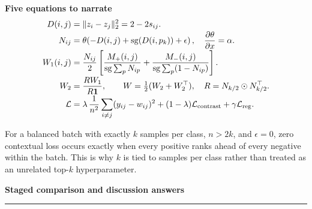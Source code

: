 \documentclass[10pt]{article}
\newcommand{\sg}{\operatorname{sg}}
\begin{document}
\textbf{Five equations to narrate}
\begin{align*}
D(i,j)&=\lVert z_i-z_j\rVert_2^2=2-2s_{ij}.\\[-2pt]
N_{ij}&=\theta\!\left(-D(i,j)+\sg(D(i,p_k))+\epsilon\right),
\quad \frac{\partial\theta}{\partial x}=\alpha.\\[-2pt]
W_1(i,j)&=\frac{N_{ij}}{2}\left[\frac{M_+(i,j)}{\sg\sum_pN_{ip}}+\frac{M_-(i,j)}{\sg\sum_p(1-N_{ip})}\right].\\[-2pt]
W_2&=\frac{RW_1}{R\mathbf 1},\qquad W=\tfrac12(W_2+W_2^\top),\quad R=N_{k/2}\odot N_{k/2}^\top.\\[-2pt]
\mathcal L&=\lambda\,\frac{1}{n^2}\sum_{i\ne j}(y_{ij}-w_{ij})^2+(1-\lambda)\mathcal L_{\rm contrast}+\gamma\mathcal L_{\rm reg}.
\end{align*}

\begin{meetbox}[title=\textbf{The key theoretical statement}]
For a balanced batch with exactly $k$ samples per class, $n>2k$, and $\epsilon=0$, zero contextual loss occurs exactly when every positive ranks ahead of every negative within the batch. This is why $k$ is tied to samples per class rather than treated as an unrelated top-$k$ hyperparameter.
\end{meetbox}

\newpage
{\sffamily\bfseries\color{navy}\Large Staged comparison and discussion answers}\vspace{2mm}\hrule\vspace{3mm}
\end{document}
